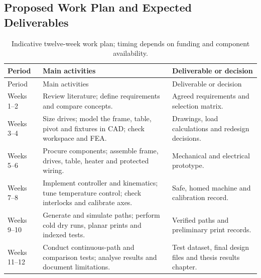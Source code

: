 \documentclass[12pt,a4paper]{article}
\begin{document}
\Needspace{250pt}
\subsection{Proposed Work Plan and Expected
  Deliverables}\label{proposed-work-plan-and-expected-deliverables}

\begingroup
\footnotesize
\setlength{\tabcolsep}{4pt}
\renewcommand{\arraystretch}{1.12}
\begin{longtable}[]{@{}
  >{\raggedright\arraybackslash}p{}
  >{\raggedright\arraybackslash}p{}
  >{\raggedright\arraybackslash}p{}@{}}
\caption{Indicative twelve-week work plan; timing depends on funding and component
  availability.}\tabularnewline
\toprule\noalign{}
\begin{minipage}[b]{\linewidth}\raggedright
Period
\end{minipage} & \begin{minipage}[b]{\linewidth}\raggedright
Main activities
\end{minipage} & \begin{minipage}[b]{\linewidth}\raggedright
Deliverable or decision
\end{minipage} \\
\midrule\noalign{}
\endfirsthead
\toprule\noalign{}
\begin{minipage}[b]{\linewidth}\raggedright
Period
\end{minipage} & \begin{minipage}[b]{\linewidth}\raggedright
Main activities
\end{minipage} & \begin{minipage}[b]{\linewidth}\raggedright
Deliverable or decision
\end{minipage} \\
\midrule\noalign{}
\endhead
\bottomrule\noalign{}
\endlastfoot
Weeks 1--2 & Review literature; define requirements and compare concepts. & Agreed requirements and
  selection matrix. \\
Weeks 3--4 & Size drives; model the frame, table, pivot and fixtures in CAD; check workspace and FEA. &
  Drawings, load calculations and redesign decisions. \\
Weeks 5--6 & Procure components; assemble frame, drives, table, heater and protected wiring. & Mechanical
  and electrical prototype. \\
Weeks 7--8 & Implement controller and kinematics; tune temperature control; check interlocks and
  calibrate axes. & Safe, homed machine and calibration record. \\
Weeks 9--10 & Generate and simulate paths; perform cold dry runs, planar prints and indexed tests. &
  Verified paths and preliminary print records. \\
Weeks 11--12 & Conduct continuous-path and comparison tests; analyse results and document limitations. &
  Test dataset, final design files and thesis results chapter. \\
\end{longtable}
\endgroup
\end{document}
